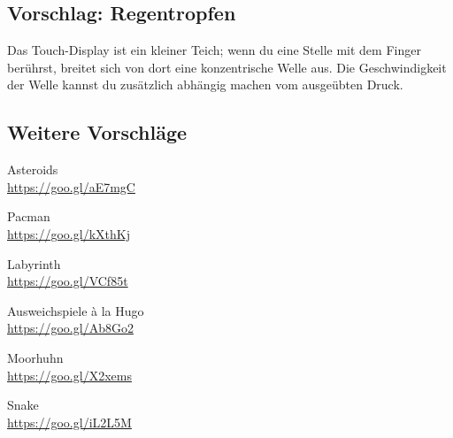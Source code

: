 \subsection*{Vorschlag: Regentropfen}

Das Touch-Display ist ein kleiner Teich;
wenn du eine Stelle mit dem Finger berührst, breitet sich von dort eine konzentrische Welle aus.
Die Geschwindigkeit der Welle kannst du zusätzlich abhängig machen vom ausgeübten Druck.


\subsection*{Weitere Vorschläge}
\begin{minipage}{.45\textwidth}
    \begin{center}Asteroids\\
        \href{https://goo.gl/aE7mgC}{https://goo.gl/aE7mgC}
    \end{center}
    \vspace{2ex}
    \begin{center}Pacman\\
        \href{https://goo.gl/kXthKj}{https://goo.gl/kXthKj}
    \end{center}
    \vspace{2ex}
    \begin{center}Labyrinth\\
        \href{https://goo.gl/VCf85t}{https://goo.gl/VCf85t}
    \end{center}
\end{minipage}
\begin{minipage}{.45\textwidth}
	\begin{center}Ausweichspiele à la Hugo\\
        \href{https://goo.gl/Ab8Go2}{https://goo.gl/Ab8Go2}
    \end{center}
    \vspace{2ex}
	\begin{center}Moorhuhn\\
        \href{https://goo.gl/X2xems}{https://goo.gl/X2xems}
    \end{center}
    \vspace{2ex}
	\begin{center}Snake\\
       \href{https://goo.gl/iL2L5M}{https://goo.gl/iL2L5M}
    \end{center}
\end{minipage}


